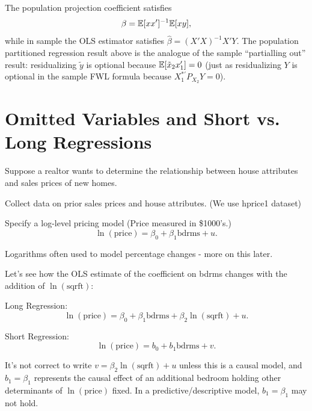 \begin{remark}
	The population projection coefficient satisfies
	\[
		\beta = \mathbb{E}[xx']^{-1}\mathbb{E}[xy],
	\]
	while in sample the OLS estimator satisfies $\hat{\beta}=(X'X)^{-1}X'Y$.
	The population partitioned regression result above is the analogue of the sample ``partialling out'' result: residualizing $\tilde{y}$ is optional because $\mathbb{E}[\tilde{x}_2 x_1']=0$ (just as residualizing $Y$ is optional in the sample FWL formula because $X_1^{*'}P_{X_2}Y=0$).
\end{remark}

\section{Omitted Variables and Short vs. Long Regressions}\label{sec:ovb-short-long}

\begin{example}	Suppose a realtor wants to determine the relationship between house attributes and sales prices of new homes.
	
	Collect data on prior sales prices and house attributes. (We use hprice1 dataset)
	
	Specify a log-level pricing model (Price measured in \$1000's.) \[
		\ln(\text{price}) = \beta_0 + \beta_1 \text{bdrms} + u
	.\] 
	
	Logarithms often used to model percentage changes - more on this later.
	
	Let's see how the OLS estimate of the coefficient on bdrms changes with the addition of $\ln(\text{sqrft})$:
	
	Long Regression: \[
		\ln(\text{price}) = \beta_0 + \beta_1 \text{bdrms} + \beta_2 \ln(\text{sqrft}) + u
	.\] 
	
	Short Regression: \[
		\ln(\text{price}) = b_0 + b_1 \text{bdrms} + v
	.\] 
	
	It's not correct to write $v = \beta_2 \ln(\text{sqrft}) + u$ unless this is a causal model, and $b_1 = \beta_1$ represents the causal effect of an additional bedroom holding other determinants of $\ln(\text{price})$ fixed. In a predictive/descriptive model, $b_1 = \beta_1$ may not hold.
\end{example}

